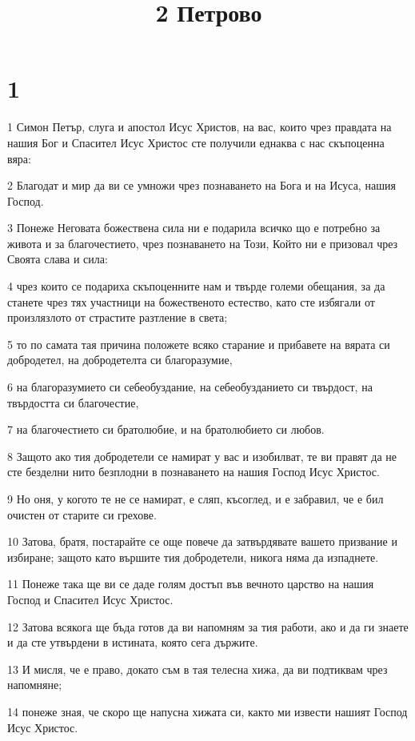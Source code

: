 

\title{2 Петрово}


\chapter{1}

\par 1 Симон Петър, слуга и апостол Исус Христов, на вас, които чрез правдата на нашия Бог и Спасител Исус Христос сте получили еднаква с нас скъпоценна вяра:
\par 2 Благодат и мир да ви се умножи чрез познаването на Бога и на Исуса, нашия Господ.
\par 3 Понеже Неговата божествена сила ни е подарила всичко що е потребно за живота и за благочестието, чрез познаването на Този, Който ни е призовал чрез Своята слава и сила:
\par 4 чрез които се подариха скъпоценните нам и твърде големи обещания, за да станете чрез тях участници на божественото естество, като сте избягали от произлязлото от страстите разтление в света;
\par 5 то по самата тая причина положете всяко старание и прибавете на вярата си добродетел, на добродетелта си благоразумие,
\par 6 на благоразумието си себеобуздание, на себеобузданието си твърдост, на твърдостта си благочестие,
\par 7 на благочестието си братолюбие, и на братолюбието си любов.
\par 8 Защото ако тия добродетели се намират у вас и изобилват, те ви правят да не сте безделни нито безплодни в познаването на нашия Господ Исус Христос.
\par 9 Но оня, у когото те не се намират, е сляп, късоглед, и е забравил, че е бил очистен от старите си грехове.
\par 10 Затова, братя, постарайте се още повече да затвърдявате вашето призвание и избиране; защото като вършите тия добродетели, никога няма да изпаднете.
\par 11 Понеже така ще ви се даде голям достъп във вечното царство на нашия Господ и Спасител Исус Христос.
\par 12 Затова всякога ще бъда готов да ви напомням за тия работи, ако и да ги знаете и да сте утвърдени в истината, която сега държите.
\par 13 И мисля, че е право, докато съм в тая телесна хижа, да ви подтиквам чрез напомняне;
\par 14 понеже зная, че скоро ще напусна хижата си, както ми извести нашият Господ Исус Христос.
